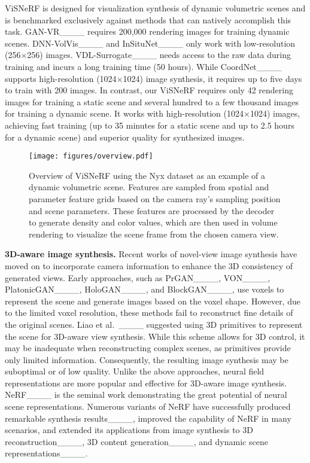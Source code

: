 ViSNeRF is designed for visualization synthesis of dynamic volumetric scenes and is benchmarked exclusively against methods that can natively accomplish this task. GAN-VR____ requires 200,000 rendering images for training dynamic scenes. DNN-VolVis____ and InSituNet____ only work with low-resolution (256$\times$256) images. VDL-Surrogate____ needs access to the raw data during training and incurs a long training time (50 hours). While CoordNet____ supports high-resolution (1024$\times$1024) image synthesis, it requires up to five days to train with 200 images. In contrast, our ViSNeRF requires only 42 rendering images for training a static scene and several hundred to a few thousand images for training a dynamic scene. It works with high-resolution (1024$\times$1024) images, achieving fast training (up to 35 minutes for a static scene and up to 2.5 hours for a dynamic scene) and superior quality for synthesized images.

\begin{figure*}[htb]
  \begin{center}
    \texttt{[image: figures/overview.pdf]}\\
 \end{center}
\vspace{-.25in} 
 \caption{Overview of ViSNeRF using the Nyx dataset as an example of a dynamic volumetric scene. Features are sampled from spatial and parameter feature grids based on the camera ray's sampling position and scene parameters. These features are processed by the decoder to generate density and color values, which are then used in volume rendering to visualize the scene frame from the chosen camera view.}
 \label{fig:overview}
\end{figure*}

{\bf 3D-aware image synthesis.}
Recent works of novel-view image synthesis have moved on to incorporate camera information to enhance the 3D consistency of generated views. 
Early approaches, such as PrGAN____, VON____, PlatonicGAN____, HoloGAN____, and BlockGAN____, use voxels to represent the scene and generate images based on the voxel shape. 
However, due to the limited voxel resolution, these methods fail to reconstruct fine details of the original scenes. 
Liao et al.\ ____ suggested using 3D primitives to represent the scene for 3D-aware view synthesis. 
While this scheme allows for 3D control, it may be inadequate when reconstructing complex scenes, as primitives provide only limited information.
Consequently, the resulting image synthesis may be suboptimal or of low quality.
%
Unlike the above approaches, neural field representations are more popular and effective for 3D-aware image synthesis. 
NeRF____ is the seminal work demonstrating the great potential of neural scene representations. 
Numerous variants of NeRF have successfully produced remarkable synthesis results____, improved the capability of NeRF in many scenarios, and extended its applications from image synthesis to 3D reconstruction____, 3D content generation____, and dynamic scene representations____.


